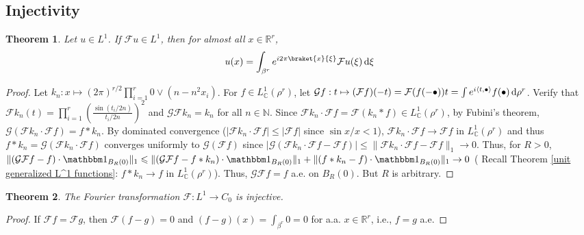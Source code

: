 \documentclass[11pt, a4paper, openany]{book}
\newtheorem{thm}{Theorem}\newtheorem{lem}{Lemma}\newtheorem{crl}{Corollary}
\theoremstyle{definition}
\begin{document}
\subsection{Injectivity}
    \begin{thm}\label{Fourier inversion transform}
        Let $u\in L^1$. If $\mathcal{F}u\in L^1$, then for almost all $x\in \mathbb{R}^r$,
        \[
            u(x)=\int_{\beta^r} e^{i2\pi\braket{x}{\xi}}\mathcal{F}u(\xi)\odif\xi
        \]
    \end{thm}
    \begin{proof}
        Let $k_n:x\mapsto (2\pi)^{r/2}\prod_{i=1}^r 0\vee (n-n^2x_i)$. For $f\in L^1_\mathbb{C}(\rho^r)$, let $\mathcal{G}f:t\mapsto (\mathcal{F}f)(-t)=\mathcal{F}(f(-\bullet))t=\int e^{i\langle t,\bullet\rangle}f(\bullet)\odif\rho^r$. Verify that $\mathcal{F}k_n(t)=\prod_{i=1}^r(\frac{\sin (t_i/2n)}{t_i/2n})^2$ and $\mathcal{G}\mathcal{F}k_n=k_n$ for all $n\in\mathbb{N}$. Since $\mathcal{F}k_n\cdot \mathcal{F}f=\mathcal{F}(k_n*f)\in L^1_\mathbb{C}(\rho^r)$, by Fubini's theorem, $\mathcal{G}(\mathcal{F}k_n\cdot \mathcal{F}f)=f*k_n$. By dominated convergence ($|\mathcal{F}k_n\cdot \mathcal{F}f|\leqslant |\mathcal{F}f|$ since $\sin x/x<1$), $\mathcal{F}k_n\cdot \mathcal{F}f\to \mathcal{F}f$ in $L^1_\mathbb{C}(\rho^r)$ and thus $f*k_n=\mathcal{G}(\mathcal{F}k_n\cdot \mathcal{F}f)$ converges uniformly to $\mathcal{G}(\mathcal{F}f)$ since $|\mathcal{G}(\mathcal{F}k_n\cdot \mathcal{F}f-\mathcal{F}f)|\leqslant \|\mathcal{F}k_n\cdot \mathcal{F}f-\mathcal{F}f\|_1\to 0$. Thus, for $R>0$, $\|(\mathcal{G}\mathcal{F}f-f)\cdot \one_{B_R(0)}\|_1\leqslant \|(\mathcal{G}\mathcal{F}f-f*k_n)\cdot \one_{B_R(0)}\|_1+\|(f*k_n-f)\cdot \one_{B_R(0)}\|_1\to 0$ (
        Recall Theorem \ref{unit generalized L^1 functions}: $f*k_n\to f$ in $L^1_\mathbb{C}(\rho^r)$). Thus, $\mathcal{G}\mathcal{F}f=f$ a.e. on $B_R(0)$. But $R$ is arbitrary.
    \end{proof}
    \begin{thm}
        The Fourier transformation $\mathcal{F}:L^1\rightarrow C_0$ is injective.
    \end{thm}
    \begin{proof}
        If $\mathcal{F}f=\mathcal{F}g$, then $\mathcal{F}(f-g)=0$ and $(f-g)(x)=\int_{\beta^r} 0=0$ for a.a. $x\in\mathbb{R}^r$, i.e., $f=g$ a.e.
    \end{proof}
\end{document}
